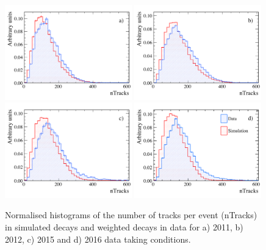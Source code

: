 \begin{figure}[tbp]
  \centering
    \includegraphics[width=0.49\textwidth]{./Figs/LifetimeMeasurement/Bd2KPi_2011_data_MC_nTracks.pdf}
    \includegraphics[width=0.49\textwidth]{./Figs/LifetimeMeasurement/Bd2KPi_2012_data_MC_nTracks.pdf}
    \includegraphics[width=0.49\textwidth]{./Figs/LifetimeMeasurement/Bd2KPi_2015_data_MC_nTracks.pdf}
    \includegraphics[width=0.49\textwidth]{./Figs/LifetimeMeasurement/Bd2KPi_2016_data_MC_nTracks.pdf}
  \caption{Normalised histograms of the number of tracks per event (nTracks) in simulated \bdkpi decays and weighted \bdkpi decays in data for a) 2011, b) 2012, c) 2015 and d) 2016 data taking conditions.}  \label{fig:nTracksMCDataComp}
\end{figure}





